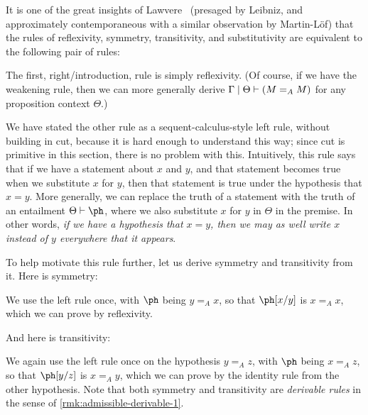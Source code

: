 It is one of the great insights of Lawvere~\cite{lawvere:comprehension} (presaged by Leibniz, and approximately contemporaneous with a similar observation by Martin-L\"of) that the rules of reflexivity, symmetry, transitivity, and substitutivity are equivalent to the following pair of rules:
The first, right/introduction, rule is simply reflexivity.
(Of course, if we have the weakening rule, then we can more generally derive $\Gamma\cb \Theta\types (M=_A M)$ for any proposition context $\Theta$.)

We have stated the other rule as a sequent-calculus-style left rule, without building in cut, because it is hard enough to understand this way; since cut is primitive in this section, there is no problem with this.
Intuitively, this rule says that if we have a statement about $x$ and $y$, and that statement becomes true when we substitute $x$ for $y$, then that statement is true under the hypothesis that $x=y$.
More generally, we can replace the truth of a statement with the truth of an entailment $\Theta\types \ph$, where we also substitute $x$ for $y$ in $\Theta$ in the premise.
In other words, \emph{if we have a hypothesis that $x=y$, then we may as well write $x$ instead of $y$ everywhere that it appears}.

To help motivate this rule further, let us derive symmetry and transitivity from it.
Here is symmetry:
\begin{mathpar}
\end{mathpar}
We use the left rule once, with $\ph$ being $y=_A x$, so that $\ph[x/y]$ is $x=_A x$, which we can prove by reflexivity.

And here is transitivity:
\begin{mathpar}
\end{mathpar}
We again use the left rule once on the hypothesis $y=_A z$, with $\ph$ being $x=_A z$, so that $\ph[y/z]$ is $x=_A y$, which we can prove by the identity rule from the other hypothesis.
Note that both symmetry and transitivity are \emph{derivable rules} in the sense of \cref{rmk:admissible-derivable-1}.

